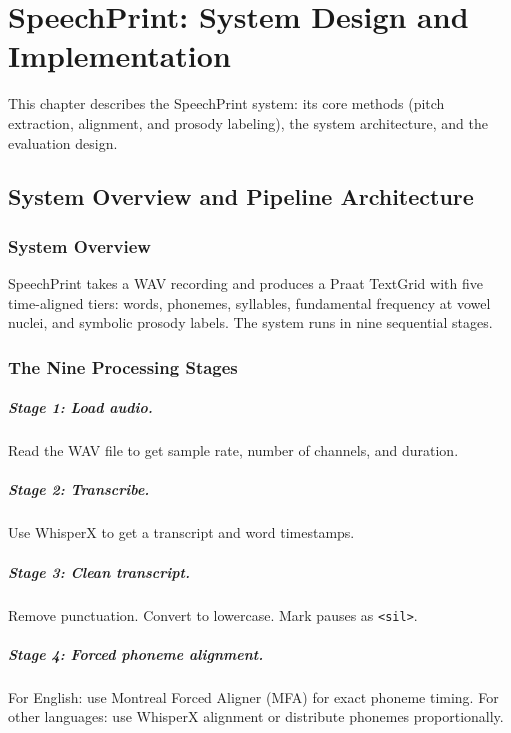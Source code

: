 \chapter{SpeechPrint: System Design and Implementation}
\label{speechprint}

This chapter describes the SpeechPrint system: its core methods (pitch extraction, alignment, and prosody labeling), the system architecture, and the evaluation design.

\section{System Overview and Pipeline Architecture}

\subsection{System Overview}

SpeechPrint takes a WAV recording and produces a Praat TextGrid with five time-aligned tiers: words, phonemes, syllables, fundamental frequency at vowel nuclei, and symbolic prosody labels. The system runs in nine sequential stages.

\subsection{The Nine Processing Stages}

\paragraph{Stage 1: Load audio.}
Read the WAV file to get sample rate, number of channels, and duration.

\paragraph{Stage 2: Transcribe.}
Use WhisperX to get a transcript and word timestamps.

\paragraph{Stage 3: Clean transcript.}
Remove punctuation. Convert to lowercase. Mark pauses as \texttt{<sil>}.

\paragraph{Stage 4: Forced phoneme alignment.}
For English: use Montreal Forced Aligner (MFA) for exact phoneme timing. For other languages: use WhisperX alignment or distribute phonemes proportionally.

